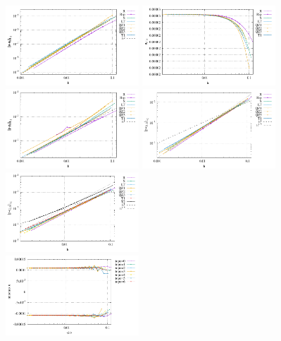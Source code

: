\begin{center}
\includegraphics[width=5cm]{python_codes/fieldstone_78/results/errors_u_exp5.pdf}
\includegraphics[width=5cm]{python_codes/fieldstone_78/results/vrms_exp5.pdf} \\
\includegraphics[width=5cm]{python_codes/fieldstone_78/results/errors_p_exp5.pdf}
\includegraphics[width=5cm]{python_codes/fieldstone_78/results/errors_q1_exp5.pdf}
\includegraphics[width=5cm]{python_codes/fieldstone_78/results/errors_q2_exp5.pdf}\\
\includegraphics[width=5cm]{python_codes/fieldstone_78/results/stats_u_exp5.pdf}

\end{center}
